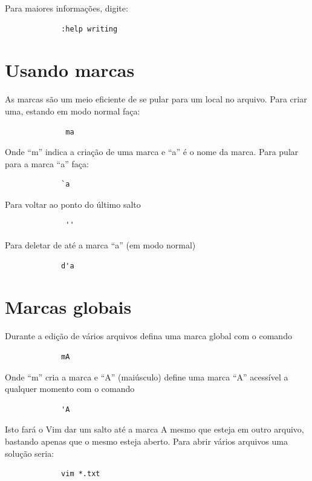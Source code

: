 \documentclass[10pt,a4paper,openany]{book}
\begin{document}
Para maiores informações, digite:

\begin{verbatim}
			 :help writing
\end{verbatim}

\section{Usando marcas}
\label{sec:Usando marcas}

As marcas são um meio eficiente de se pular para um local no arquivo. Para
criar uma,  estando em modo normal faça:

\begin{verbatim}
			  ma
\end{verbatim}

Onde ``m'' indica a criação de uma marca e ``a'' é o nome da marca. Para pular para a marca ``a'' faça:

\begin{verbatim}
			 `a
\end{verbatim}

Para voltar ao ponto do último salto

\begin{verbatim}
			  ''
\end{verbatim}

Para deletar de até a marca ``a'' (em modo normal)

\begin{verbatim}
			 d'a
\end{verbatim}

\section{Marcas globais}
Durante a edição de vários arquivos defina uma marca global com o comando

\begin{verbatim}
			 mA
\end{verbatim}

Onde ``m'' cria a marca e ``A'' (maiúsculo) define uma marca ``A'' acessível a qualquer momento com o comando

\begin{verbatim}
			 'A
\end{verbatim}

Isto fará o Vim dar um salto até a marca A mesmo que esteja em outro
arquivo, bastando apenas que o mesmo esteja aberto. Para abrir vários
arquivos uma solução seria:

\begin{verbatim}
			 vim *.txt
\end{verbatim}
\end{document}
